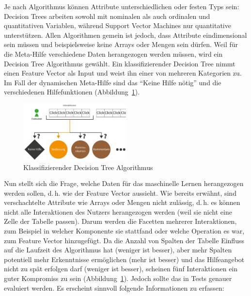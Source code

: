 \documentclass[
	headsepline,
	footsepline,
	fontsize=12pt,
	bibliography=totoc
]{scrbook}
\begin{document}
Je nach Algorithmus können Attribute unterschiedlichen oder festen Typs sein: Decision Trees arbeiten sowohl mit nominalen als auch ordinalen und quantitativen Variablen, während Support Vector Machines nur quantitative unterstützen. Allen Algorithmen gemein ist jedoch, dass Attribute eindimensional sein müssen und beispielsweise keine Arrays oder Mengen sein dürfen. Weil für die Meta-Hilfe verschiedene Daten herangezogen werden müssen, wird ein Decision Tree Algorithmus gewählt. Ein klassifizierender Decision Tree nimmt einen Feature Vector als Input und weist ihn einer von mehreren Kategorien zu. Im Fall der dynamischen Meta-Hilfe sind das \enquote{Keine Hilfe nötig} und die verschiedenen Hilfefunktionen (Abbildung~\ref{figure:sml-ziel}).

\begin{figure}[htbp]
   \centering
   \includegraphics[width=0.5\textwidth]{images/konzeption-sml-ziel.png}
   \caption{Klassifizierender Decision Tree Algorithmus}
   \label{figure:sml-ziel}
\end{figure}

Nun stellt sich die Frage, welche Daten für das maschinelle Lernen herangezogen werden sollen, d.\,h. wie der Feature Vector aussieht. Wie bereits erwähnt, sind verschachtelte Attribute wie Arrays oder Mengen nicht zulässig, d.\,h. es können nicht alle Interaktionen des Nutzers herangezogen werden (weil sie nicht eine Zelle der Tabelle passen). Darum werden die Facetten mehrerer Interaktionen, zum Beispiel in welcher Komponente sie stattfand oder welche Operation es war, zum Feature Vector hinzugefügt. Da die Anzahl von Spalten der Tabelle Einfluss auf die Laufzeit des Algorithmus hat (weniger ist besser), aber mehr Spalten potentiell mehr Erkenntnisse ermöglichen (mehr ist besser) und das Hilfeangebot nicht zu spät erfolgen darf (weniger ist besser), scheinen fünf Interaktionen ein guter Kompromiss zu sein (Abbildung~\ref{figure:sml-ziel}). Jedoch sollte das in Tests genauer evaluiert werden. Es erscheint sinnvoll folgende Informationen zu erfassen:
\end{document}
